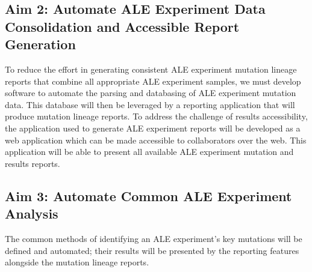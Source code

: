 \documentclass[12pt,final,masters,chapterheads]{ucsd}  %
\begin{document}
\subsection{Aim 2: Automate ALE Experiment Data Consolidation and Accessible Report Generation}
To reduce the effort in generating consistent ALE experiment mutation lineage reports that combine all appropriate ALE experiment samples, we must develop software to automate the parsing and databasing of ALE experiment mutation data. This database will then be leveraged by a reporting application that will produce mutation lineage reports. To address the challenge of results accessibility, the application used to generate ALE experiment reports will be developed as a web application which can be made accessible to collaborators over the web. This application will be able to present all available ALE experiment mutation and results reports.
\subsection{Aim 3: Automate Common ALE Experiment Analysis}
%
%
The common methods of identifying an ALE experiment's key mutations will be defined and automated; their results will be presented by the reporting features alongside the mutation lineage reports.


\end{document}
